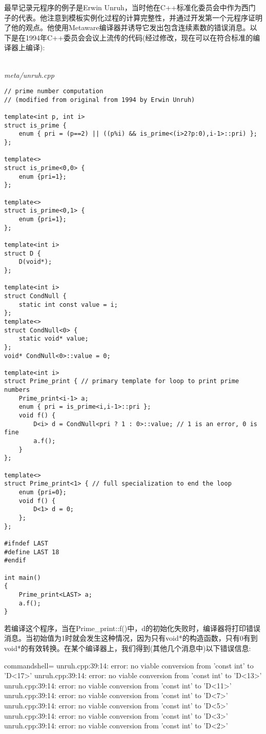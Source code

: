 最早记录元程序的例子是Erwin Unruh，当时他在C++标准化委员会中作为西门子的代表。他注意到模板实例化过程的计算完整性，并通过开发第一个元程序证明了他的观点。他使用Metaware编译器并诱导它发出包含连续素数的错误消息。以下是在1994年C++委员会会议上流传的代码(经过修改，现在可以在符合标准的编译器上编译):

\hspace*{\fill} \\ %
\noindent
\textit{meta/unruh.cpp}
\begin{lstlisting}[style=styleCXX]
// prime number computation
// (modified from original from 1994 by Erwin Unruh)

template<int p, int i>
struct is_prime {
	enum { pri = (p==2) || ((p%i) && is_prime<(i>2?p:0),i-1>::pri) };
};

template<>
struct is_prime<0,0> {
	enum {pri=1};
};

template<>
struct is_prime<0,1> {
	enum {pri=1};
};

template<int i>
struct D {
	D(void*);
};

template<int i>
struct CondNull {
	static int const value = i;
};
template<>
struct CondNull<0> {
	static void* value;
};
void* CondNull<0>::value = 0;

template<int i>
struct Prime_print { // primary template for loop to print prime numbers
	Prime_print<i-1> a;
	enum { pri = is_prime<i,i-1>::pri };
	void f() {
		D<i> d = CondNull<pri ? 1 : 0>::value; // 1 is an error, 0 is fine
		a.f();
	}
};

template<>
struct Prime_print<1> { // full specialization to end the loop
	enum {pri=0};
	void f() {
		D<1> d = 0;
	};
};

#ifndef LAST
#define LAST 18
#endif

int main()
{
	Prime_print<LAST> a;
	a.f();
}
\end{lstlisting}

若编译这个程序，当在Prime\_print::f()中，d的初始化失败时，编译器将打印错误消息。当初始值为1时就会发生这种情况，因为只有void*的构造函数，只有0有到void*的有效转换。在某个编译器上，我们得到(其他几个消息中)以下错误信息:

{\footnotesize
\begin{tcblisting}{commandshell={}}
unruh.cpp:39:14: error: no viable conversion from ’const int’ to ’D<17>’
unruh.cpp:39:14: error: no viable conversion from ’const int’ to ’D<13>’
unruh.cpp:39:14: error: no viable conversion from ’const int’ to ’D<11>’
unruh.cpp:39:14: error: no viable conversion from ’const int’ to ’D<7>’
unruh.cpp:39:14: error: no viable conversion from ’const int’ to ’D<5>’
unruh.cpp:39:14: error: no viable conversion from ’const int’ to ’D<3>’
unruh.cpp:39:14: error: no viable conversion from ’const int’ to ’D<2>’
\end{tcblisting}
}

